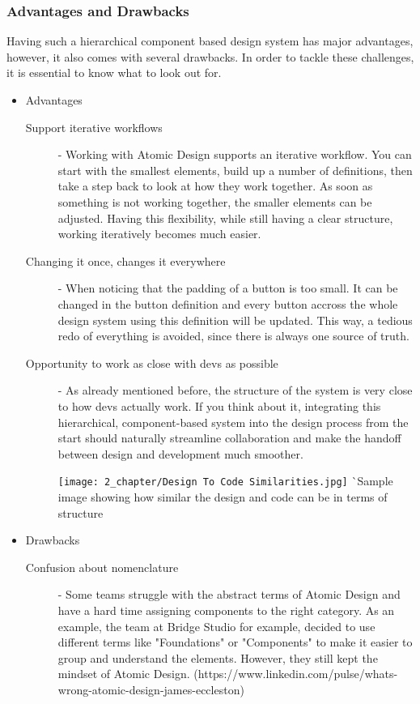 \subsubsection{Advantages and Drawbacks}
Having such a hierarchical component based design system has major advantages, however, it also
comes with several drawbacks. In order to tackle these challenges, it is essential to know what to
look out for.

\begin{itemize}
	\item Advantages
	      \begin{description}
		      \item[Support iterative workflows] - Working with Atomic Design supports an iterative
		            workflow. You can start with the smallest elements, build up a number of
		            definitions, then take a step back to look at how they work together. As soon as
		            something is not working together, the smaller elements can be adjusted. Having
		            this flexibility, while still having a clear structure, working iteratively
		            becomes much easier.  
		      \item[Changing it once, changes it everywhere] - When noticing that the padding
		            of a button is too small. It can be changed in the button definition and every
		            button accross the whole design system using this definition will be updated.
		            This way, a tedious redo of everything is avoided, since there is always one
		            source of truth.
		      \item[Opportunity to work as close with devs as possible] - As already mentioned
		            before, the structure of the system is very close to how devs actually work.
		            If you think about it, integrating this hierarchical, component-based system
		            into the design process from the start should naturally streamline collaboration
		            and make the handoff between design and development much smoother.

		            \texttt{[image: 2\_chapter/Design To Code Similarities.jpg]}
		            ^^ Sample image showing how similar the design and code can be in terms of structure
	      \end{description}
	\item Drawbacks
	      \begin{description}
		      \item[Confusion about nomenclature] - Some teams struggle with the abstract terms of
		            Atomic Design and have a hard time assigning components to the right category.
		            As an example, the team at Bridge Studio for example, decided to use different
		            terms like "Foundations" or "Components" to make it easier to group and
		            understand the elements. However, they still kept the mindset of Atomic Design.
		            (https://www.linkedin.com/pulse/whats-wrong-atomic-design-james-eccleston)


\end{description}
\end{itemize}
